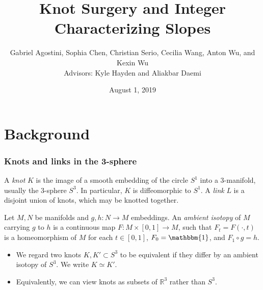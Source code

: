 \documentclass{beamer}
\title[Integer Characterizing Slopes]{Knot Surgery and Integer Characterizing Slopes}
\author[Agostini, Chen, Serio, Wang, Wu, and Wu\;\;\;]{Gabriel Agostini, Sophia Chen, Christian Serio, Cecilia Wang, Anton Wu, and Kexin Wu\\
Advisors: Kyle Hayden and Aliakbar Daemi}
\institute{Columbia University}
\date{August 1, 2019}
\theoremstyle{ex}
\theoremstyle{rem}
\begin{document}
	
	\begin{frame}
		\titlepage
	\end{frame}

\section{Background}
	\begin{frame}
		\frametitle{Knots and links in the 3-sphere}
		\begin{definition}
			A \textit{knot} $K$ is the image of a smooth embedding of the circle $S^1$ into a 3-manifold, usually the $3$-sphere $S^3$. In particular, $K$ is diffeomorphic to $S^1$. A \textit{link} $L$ is a disjoint union of knots, which may be knotted together.
		\end{definition}
		\begin{definition}
		Let $M,N$ be manifolds and $g,h\!:N\to M$ embeddings. An \textit{ambient isotopy} of $M$ carrying $g$ to $h$ is a continuous map $F\!:M\times[0,1]\to M$, such that $F_t=F(\cdot,t)$ is a homeomorphism of $M$ for each $t\in[0,1]$,  $F_0=\mathbbm{1}$, and $F_1\circ g = h$.
		\end{definition}
		\begin{itemize}
		\item We regard two knots $K,K'\subset S^3$ to be equivalent if they differ by an ambient isotopy of $S^3$. We write $K\simeq K'$.	
		\item Equivalently, we can view knots as subsets of $\mathbb{R}^3$ rather than $S^3$.
		
		\end{itemize}
	\end{frame}
\end{document}
